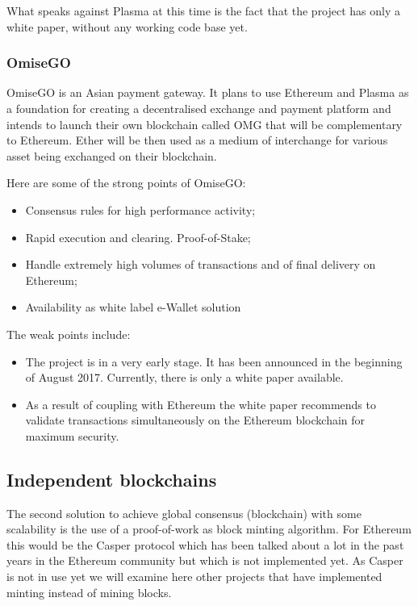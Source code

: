 What speaks against Plasma at this time is the fact that the project has only a white paper, without any working code base yet.

\subsubsection{OmiseGO}
OmiseGO is an Asian payment gateway. It plans to use Ethereum and Plasma as a foundation for creating a decentralised exchange and payment platform \cite{OMG} and intends to launch their own blockchain called OMG that will be complementary to Ethereum. Ether will be then used as a medium of interchange for various asset being exchanged on their blockchain.

Here are some of the strong points of OmiseGO:
\begin{itemize}
    \item Consensus rules for high performance activity;
    \item Rapid execution and clearing. Proof-of-Stake;
    \item Handle extremely high volumes of transactions and of final delivery on Ethereum;
    \item Availability as white label e-Wallet solution
\end{itemize}

The weak points include:

\begin{itemize}
    \item The project is in a very early stage. It has been announced in the beginning of August 2017. Currently, there is only a white paper available.
    \item As a result of coupling with Ethereum the white paper recommends to validate transactions simultaneously on the Ethereum blockchain for maximum security.
\end{itemize}


\subsection{Independent blockchains}
The second solution to achieve global consensus (blockchain) with some scalability is the use of a proof-of-work as block minting algorithm. For Ethereum this would be the Casper protocol which has been talked about a lot in the past years in the Ethereum community but which is not implemented yet. As Casper is not in use yet we will examine here other projects that have implemented minting instead of mining blocks.

